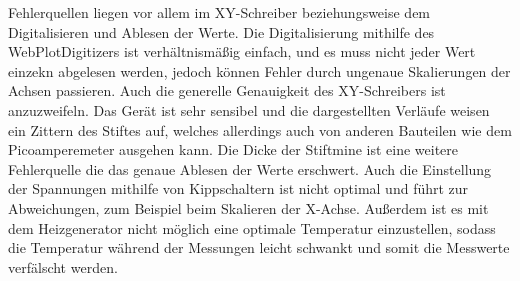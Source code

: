 Fehlerquellen liegen vor allem im XY-Schreiber beziehungsweise dem Digitalisieren und Ablesen der Werte.
Die Digitalisierung mithilfe des WebPlotDigitizers ist verhältnismäßig einfach, und es muss nicht jeder Wert einzekn abgelesen werden, 
jedoch können Fehler durch ungenaue Skalierungen der Achsen passieren.
Auch die generelle Genauigkeit des XY-Schreibers ist anzuzweifeln. Das Gerät ist sehr sensibel und die dargestellten Verläufe weisen
ein Zittern des Stiftes auf, welches allerdings auch von anderen Bauteilen wie dem Picoamperemeter ausgehen kann.
Die Dicke der Stiftmine ist eine weitere Fehlerquelle die das genaue Ablesen der Werte erschwert.
Auch die Einstellung der Spannungen mithilfe von Kippschaltern ist nicht optimal und führt zur Abweichungen, zum Beispiel beim Skalieren der
X-Achse.
Außerdem ist es mit dem Heizgenerator nicht möglich eine optimale Temperatur einzustellen, sodass die Temperatur während der Messungen 
leicht schwankt und somit die Messwerte verfälscht werden.
\pagebreak




